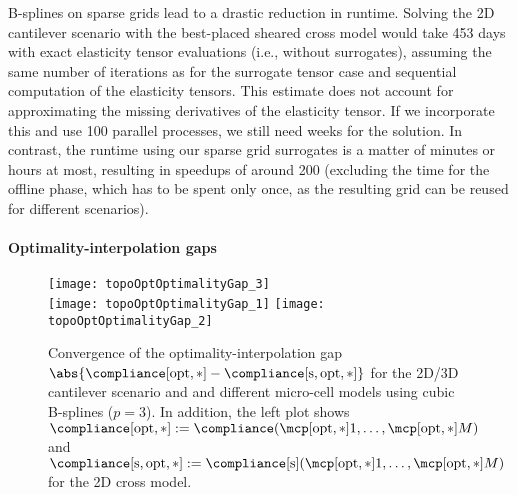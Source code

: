 B-splines on sparse grids lead to a drastic reduction in runtime.
Solving the 2D cantilever scenario with the best-placed sheared cross model
would take 453 days with
exact elasticity tensor evaluations (i.e., without surrogates),
assuming the same number of iterations as for the surrogate tensor case
and sequential computation of the elasticity tensors.
This estimate does not account for approximating the missing derivatives
of the elasticity tensor.
If we incorporate this and use 100 parallel processes,
we still need weeks for the solution.
In contrast, the runtime using our sparse grid surrogates
is a matter of minutes or hours at most,
resulting in speedups of around 200
(excluding the time for the offline phase,
which has to be spent only once, as the resulting grid
can be reused for different scenarios).

\paragraph{Optimality-interpolation gaps}

\begin{figure}
  \texttt{[image: topoOptOptimalityGap\_3]}%
  \\[2mm]%
  \texttt{[image: topoOptOptimalityGap\_1]}%
  \hfill%
  \texttt{[image: topoOptOptimalityGap\_2]}%
  \caption[Convergence of the optimality-interpolation gap]{%
    Convergence of the optimality-interpolation gap
    $\abs{\compliance[\opt,\ast] - \complianceintp[\opt,\ast]}$
    for the 2D/3D cantilever scenario and
    and different micro-cell models using cubic B-splines ($p = 3$).
    In addition, the left plot shows
    $\compliance[\opt,\ast]
    := \compliance(\mcpoptappr{1}, \dotsc, \mcpoptappr{M})$ and
    $\complianceintp[\opt,\ast]
    := \complianceintp(\mcpoptappr{1}, \dotsc, \mcpoptappr{M})$
    for the 2D cross model.%
  }%
  \label{fig:topoOptOptimalityGap}%
\end{figure}

